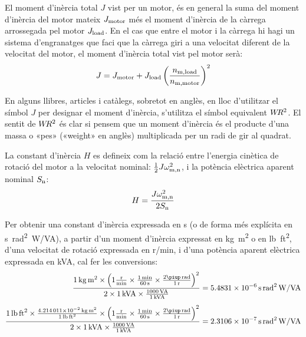 El moment d'inèrcia total $J$ vist per un motor, és en general la suma del moment d'inèrcia del  motor mateix $J_\mathrm{motor}$ més el moment d'inèrcia de la càrrega arrossegada pel motor $J_\mathrm{load}$. En el cas que entre el motor i la càrrega hi hagi un sistema d'engranatges que faci que la càrrega giri a una velocitat diferent de la velocitat del motor, el  moment d'inèrcia total vist pel motor serà:
\begin{equation}\index{moment d'inèria}\index{J@f$J$}
    J = J\ped{motor} +  J\ped{load}
    \left(\frac{n\ped{m,load}}{n\ped{m,motor}}\right)^2
\end{equation}

En alguns llibres, articles i catàlegs, sobretot en anglès, en lloc d'utilitzar el símbol $J$ per designar el moment d'inèrcia, s'utilitza el símbol equivalent $W\hspace{-0.2em}R^2$. El sentit de $W\hspace{-0.2em}R^2$ és clar si pensem que un moment d'inèrcia és el producte d'una massa o «pes» («weight» en anglès) multiplicada per un radi de gir al quadrat.

La constant d'inèrcia $H$ es defineix com la relació entre l'energia cinètica de rotació del motor  a la velocitat nominal: $\frac{1}{2} J \omega_\mathrm{m,n}^2$, i la  potència elèctrica aparent nominal $S_\mathrm{n}$:
\begin{equation}\index{constant d'inèria}\index{J@$H$}
    H = \frac{J \omega\ped{m,n}^2}{2 S\ped{n}}
\end{equation}

Per  obtenir una constant d'inèrcia  expressada en \si{s} (o de forma més explícita en \si{s.rad^2.W/VA}), a partir d'un moment d'inèrcia expressat en \si{kg.m^2} o en \si{lb.ft^2}, d'una velocitat de rotació expressada en \si{r/min}, i d'una potència aparent elèctrica expressada en \si{kVA}, cal  fer les conversions:
\begin{subequations}
\begin{align}
    \frac{\SI{1}{kg.m^2} \times \left(1\frac{\si{r}}{\si{min}} \times \frac{\SI{1}{min}}{\SI{60}{s}} \times \frac{2\piup\,\si{rad}}{\SI{1}{r}}\right)^2}{2\times \SI{1}{kVA} \times \frac{\SI{1000}{VA}}{\SI{1}{kVA}}}  &= \SI{5,4831e-6}{s.rad^2.W/VA} \\[1ex]
   \frac{\SI{1}{lb.ft^2} \times \frac{\SI{4,214011e-2}{kg.m^2}}{\SI{1}{lb.ft^2}} \times \left(1\frac{\si{r}}{\si{min}} \times \frac{\SI{1}{min}}{\SI{60}{s}} \times \frac{2\piup\,\si{rad}}{\SI{1}{r}}\right)^2}{2\times \SI{1}{kVA}  \times
   \frac{\SI{1000}{VA}}{\SI{1}{kVA}}} &= \SI{2,3106e-7}{s.rad^2.W/VA}
\end{align}
\end{subequations}

